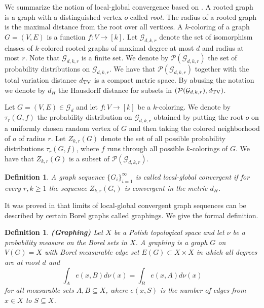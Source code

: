 \documentclass[a4wider]{amsart}
\newtheorem{definition}[theorem]{Definition}
\theoremstyle{definitionbreak}\newtheorem{D}[theorem]{Definition}
\theoremstyle{definitionbreak}\newtheorem*{D*}{Definition}
\begin{document}
We summarize the notion of local-global convergence based on \cite{HLSz}. A rooted graph is a graph with a distinguished vertex $o$ called {\it root}. The radius of a rooted graph is the maximal distance from the root over all vertices. A $k$-coloring of a graph $G=(V,E)$ is a function $f:V\to [k]$. 
Let $\mathcal{G}_{d,k,r}$ denote the set of isomorphism classes of $k$-colored rooted graphs of maximal degree at most $d$ and radius at most $r$. Note that $\mathcal{G}_{d,k,r}$ is a finite set. We denote by $\mathcal{P}(\mathcal{G}_{d,k,r})$ the set of probability distributions on $\mathcal{G}_{d,k,r}$. We have that $\mathcal{P}(\mathcal{G}_{d,k,r})$ together with the total variation distance $d_{\rm TV}$ is a compact metric space. By abusing the notation we denote by $d_H$ the Hausdorff distance for subsets in $(\mathcal{P}(\mathcal{G}_{d,k,r}),d_{\rm TV})$. 

Let $G=(V,E)\in\mathcal{G}_d$ and let $f:V\to [k]$ be a $k$-coloring. We denote by $\tau_r(G,f)$ the probability distribution on $\mathcal{G}_{d,k,r}$ obtained by putting the root $o$ on a uniformly chosen random vertex of $G$ and then taking the colored neighborhood of $o$ of radius $r$. Let $Z_{k,r}(G)$ denote the set of all possible probability distributions $\tau_r(G,f)$, where $f$ runs through all possible $k$-colorings of $G$. We have that $Z_{k,r}(G)$ is a subset of $\mathcal{P}(\mathcal{G}_{d,k,r})$.

\begin{definition} A graph sequence $\{G_i\}_{i=1}^\infty$ is called local-global convergent if for every $r,k\geq 1$ the sequence $Z_{k,r}(G_i)$ is convergent in the metric $d_H$.
\end{definition}

It was proved in \cite{HLSz} that limits of local-global convergent graph sequences can be described by certain Borel graphs called graphings. We give the formal definition.

\begin{definition} {\bf (Graphing)}  Let $X$ be a Polish topological space and let $\nu$ be a probability measure on the Borel sets in $X$. A graphing is a graph $G$ on $V(G)=X$ with Borel measurable edge set $E(G)\subset X\times X$ in which all degrees are at most $d$ and 
\begin{equation}\label{gmeaspres}
\int_A e(x,B)d\nu(x)=\int_B e(x,A)d\nu(x)
\end{equation}
 for all measurable sets $A,B\subseteq X$, where $e(x,S)$ is the number of edges from $x\in X$ to $S\subseteq X$.
\end{definition}
\end{document}
